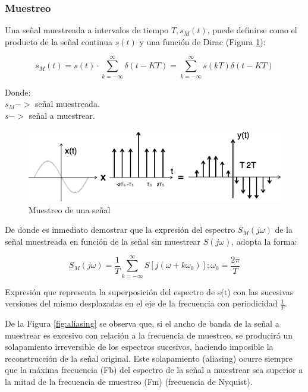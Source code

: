 \subsubsection*{Muestreo}

Una señal muestreada a intervalos de tiempo $T, s_M (t)$, puede definirse como el producto de la señal continua $s(t)$ y una función de Dirac (Figura \ref{fig:muestreoDelta}):

\begin{equation}\label{eq:muestreo}
	s_M(t)=s(t) \cdot \sum_{k=-\infty}^{\infty}\delta(t-KT)=\sum_{k=-\infty}^{\infty}s(kT)\delta(t-KT)
\end{equation}

Donde:
\\$s_M->$ señal muestreada.
\\$s->$ señal a muestrear.		

\begin{figure}[H]
	\centering
	\includegraphics[width=0.6\linewidth]{figures/muestreoDelta}
	\caption{Muestreo de una señal}
	\label{fig:muestreoDelta}
\end{figure}

De donde es inmediato demostrar que la expresión del espectro $S_M (j\omega)$ de la señal muestreada en función de la señal sin muestrear $S(j\omega)$, adopta la forma:

\begin{equation}\label{eq:muestreoEspectro}
	S_M(j\omega)=\frac{1}{T}\sum_{k=-\infty}^{\infty}S[j(\omega+k\omega_0)] ;	 \omega_0=\frac{2\pi}{T}
\end{equation}	

Expresión que representa la superposición del espectro de s(t) con las sucesivas versiones del mismo desplazadas en el eje de la frecuencia con periodicidad $\frac{1}{T}$.

De la Figura \ref{fig:aliasing} se observa que, si el ancho de banda de la señal a muestrear es excesivo con relación a la frecuencia de muestreo, se producirá un solapamiento irreversible de los espectros sucesivos, haciendo imposible la reconstrucción de la señal original. Este solapamiento (aliasing) ocurre siempre que la máxima frecuencia (Fb) del espectro de la señal a muestrear sea superior a la mitad de la frecuencia de muestreo (Fm) (frecuencia de Nyquist).

